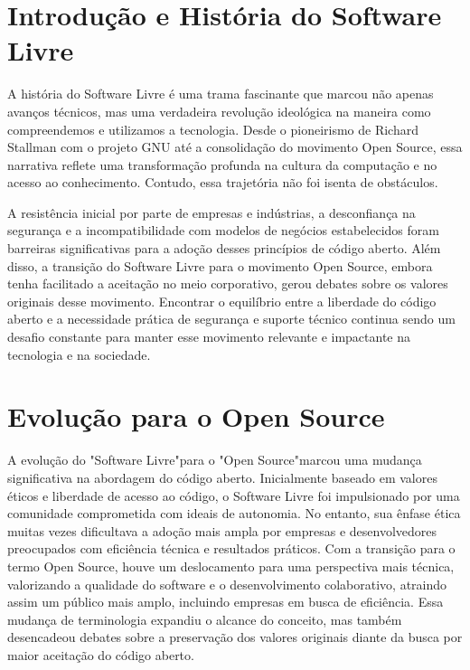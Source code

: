 \documentclass[a4paper, 12pt]{article}
\begin{document}
\newpage

\section{Introdução e História do Software Livre} 
A história do Software Livre é uma trama fascinante que marcou não apenas avanços técnicos, mas uma verdadeira revolução ideológica na maneira como compreendemos e utilizamos a tecnologia. Desde o pioneirismo de Richard Stallman com o projeto GNU até a consolidação do movimento Open Source, essa narrativa reflete uma transformação profunda na cultura da computação e no acesso ao conhecimento. Contudo, essa trajetória não foi isenta de obstáculos.\cite{dado2}

A resistência inicial por parte de empresas e indústrias, a desconfiança na segurança e a incompatibilidade com modelos de negócios estabelecidos foram barreiras significativas para a adoção desses princípios de código aberto. Além disso, a transição do Software Livre para o movimento Open Source, embora tenha facilitado a aceitação no meio corporativo, gerou debates sobre os valores originais desse movimento. Encontrar o equilíbrio entre a liberdade do código aberto e a necessidade prática de segurança e suporte técnico continua sendo um desafio constante para manter esse movimento relevante e impactante na tecnologia e na sociedade.

\section{Evolução para o Open Source}
A evolução do "Software Livre"\space para o "Open Source"\space \cite{dado1}marcou uma mudança significativa na abordagem do código aberto. Inicialmente baseado em valores éticos e liberdade de acesso ao código, o Software Livre foi impulsionado por uma comunidade comprometida com ideais de autonomia. No entanto, sua ênfase ética muitas vezes dificultava a adoção mais ampla por empresas e desenvolvedores preocupados com eficiência técnica e resultados práticos. Com a transição para o termo Open Source, houve um deslocamento para uma perspectiva mais técnica, valorizando a qualidade do software e o desenvolvimento colaborativo, atraindo assim um público mais amplo, incluindo empresas em busca de eficiência. Essa mudança de terminologia expandiu o alcance do conceito, mas também desencadeou debates sobre a preservação dos valores originais diante da busca por maior aceitação do código aberto.
\end{document}

